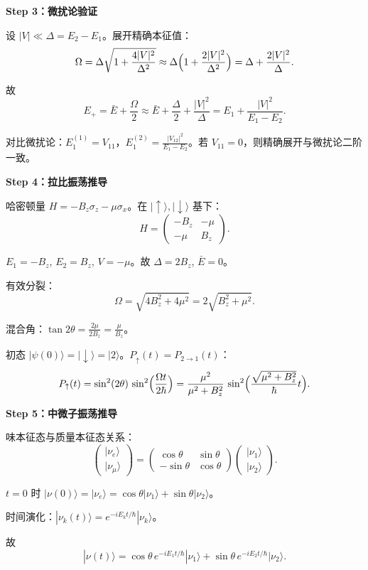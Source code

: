 \begin{derivationbox}
\textbf{Step 3：微扰论验证}

设 $|V|\ll\Delta=E_2-E_1$。展开精确本征值：
\[
\Omega=\Delta\sqrt{1+\frac{4|V|^2}{\Delta^2}}
\approx\Delta\Bigl(1+\frac{2|V|^2}{\Delta^2}\Bigr)=\Delta+\frac{2|V|^2}{\Delta}.
\]

故
\[
E_+=\bar{E}+\frac{\Omega}{2}\approx\bar{E}+\frac{\Delta}{2}+\frac{|V|^2}{\Delta}
=E_1+\frac{|V|^2}{E_1-E_2}.
\]

对比微扰论：$E_1^{(1)}=V_{11}$，$E_1^{(2)}=\frac{|V_{12}|^2}{E_1-E_2}$。若 $V_{11}=0$，则精确展开与微扰论二阶一致。

\textbf{Step 4：拉比振荡推导}

哈密顿量 $H=-B_z\sigma_z-\mu\sigma_x$。在 $|\uparrow\rangle,|\downarrow\rangle$ 基下：
\[
H=\begin{pmatrix}-B_z&-\mu\\-\mu&B_z\end{pmatrix}.
\]

$E_1=-B_z$, $E_2=B_z$, $V=-\mu$。故 $\Delta=2B_z$, $\bar{E}=0$。

有效分裂：
\[
\Omega=\sqrt{4B_z^2+4\mu^2}=2\sqrt{B_z^2+\mu^2}.
\]

混合角：$\tan2\theta=\frac{2\mu}{2B_z}=\frac{\mu}{B_z}$。

初态 $|\psi(0)\rangle=|\downarrow\rangle=|2\rangle$。$P_{\uparrow}(t)=P_{2\to1}(t)$：
\[
P_{\uparrow}(t)=\sin^2(2\theta)\,\sin^2\Bigl(\frac{\Omega t}{2\hbar}\Bigr)
=\frac{\mu^2}{\mu^2+B_z^2}\,\sin^2\Bigl(\frac{\sqrt{\mu^2+B_z^2}}{\hbar}t\Bigr).
\]

\textbf{Step 5：中微子振荡推导}

味本征态与质量本征态关系：
\[
\begin{pmatrix}|\nu_e\rangle\\|\nu_\mu\rangle\end{pmatrix}
=\begin{pmatrix}\cos\theta&\sin\theta\\-\sin\theta&\cos\theta\end{pmatrix}
\begin{pmatrix}|\nu_1\rangle\\|\nu_2\rangle\end{pmatrix}.
\]

$t=0$ 时 $|\nu(0)\rangle=|\nu_e\rangle=\cos\theta|\nu_1\rangle+\sin\theta|\nu_2\rangle$。

时间演化：$|\nu_k(t)\rangle=e^{-iE_kt/\hbar}|\nu_k\rangle$。

故
\[
|\nu(t)\rangle=\cos\theta\,e^{-iE_1t/\hbar}|\nu_1\rangle+\sin\theta\,e^{-iE_2t/\hbar}|\nu_2\rangle.
\]


\end{derivationbox}
